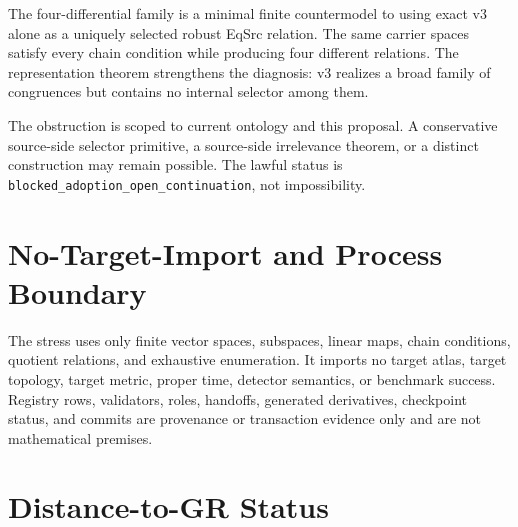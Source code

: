 \documentclass[11pt]{article}
\begin{document}
The four-differential family is a minimal finite countermodel to using exact
v3 alone as a uniquely selected robust EqSrc relation. The same carrier
spaces satisfy every chain condition while producing four different
relations. The representation theorem strengthens the diagnosis: v3 realizes
a broad family of congruences but contains no internal selector among them.

The obstruction is scoped to current ontology and this proposal. A
conservative source-side selector primitive, a source-side irrelevance
theorem, or a distinct construction may remain possible. The lawful status is
\texttt{blocked\_adoption\_open\_continuation}, not impossibility.

\section{No-Target-Import and Process Boundary}

The stress uses only finite vector spaces, subspaces, linear maps, chain
conditions, quotient relations, and exhaustive enumeration. It imports no
target atlas, target topology, target metric, proper time, detector semantics,
or benchmark success. Registry rows, validators, roles, handoffs, generated
derivatives, checkpoint status, and commits are provenance or transaction
evidence only and are not mathematical premises.

\section{Distance-to-GR Status}
\end{document}

